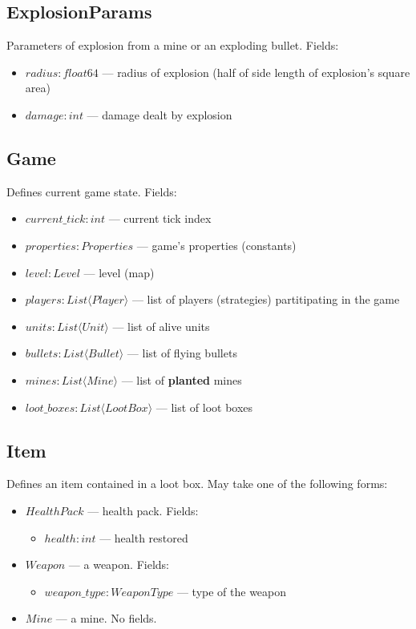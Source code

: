 \subsection{ExplosionParams}
Parameters of explosion from a mine or an exploding bullet. Fields:
\begin{itemize}
    \item $radius : float64$ --- radius of explosion (half of side length of explosion's square area)
    \item $damage : int$ --- damage dealt by explosion
\end{itemize}

\subsection{Game}
Defines current game state. Fields:
\begin{itemize}
    \item $current\_tick : int$ --- current tick index
    \item $properties : Properties$ --- game's properties (constants)
    \item $level : Level$ --- level (map)
    \item $players : List \langle Player \rangle$ --- list of players (strategies) partitipating in the game
    \item $units : List \langle Unit \rangle$ --- list of alive units
    \item $bullets : List \langle Bullet \rangle$ --- list of flying bullets
    \item $mines : List \langle Mine \rangle$ --- list of \textbf{planted} mines
    \item $loot\_boxes : List \langle LootBox \rangle$ --- list of loot boxes
\end{itemize}

\subsection{Item}
Defines an item contained in a loot box.
May take one of the following forms:
\begin{itemize}
    \item $HealthPack$ --- health pack. Fields:
        \begin{itemize}
            \item $health : int$ --- health restored
        \end{itemize}
    \item $Weapon$ --- a weapon. Fields:
        \begin{itemize}
            \item $weapon\_type : WeaponType$ --- type of the weapon
        \end{itemize}
    \item $Mine$ --- a mine. No fields.
\end{itemize}


